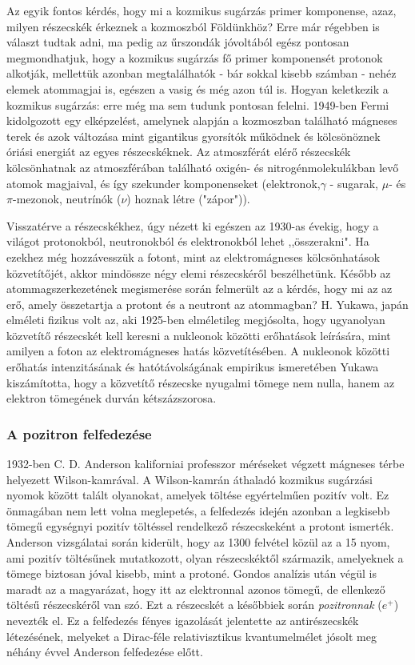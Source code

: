 \documentclass[../main.tex]{subfiles}
\begin{document}
Az egyik fontos kérdés, hogy mi a kozmikus sugárzás primer komponense, azaz, milyen részecskék érkeznek a kozmoszból Földünkhöz? Erre már régebben is választ tudtak adni, ma pedig az űrszondák jóvoltából egész
pontosan megmondhatjuk, hogy a kozmikus sugárzás fő primer komponensét protonok alkotják, mellettük azonban megtalálhatók - bár sokkal kisebb
számban - nehéz elemek atommagjai is, egészen a vasig és még azon túl is. Hogyan keletkezik a kozmikus sugárzás: erre még ma sem tudunk pontosan felelni. 1949-ben Fermi kidolgozott egy elképzelést, amelynek alapján
a kozmoszban található mágneses terek és azok változása mint gigantikus gyorsítók működnek és kölcsönöznek óriási energiát az egyes részecskéknek.
Az atmoszférát elérő részecskék kölcsönhatnak az atmoszférában található oxigén- és nitrogénmolekulákban levő atomok magjaival, és így szekunder komponenseket (elektronok,$\gamma$ - sugarak, $\mu$- és $\pi$-mezonok, neutrínók
($\nu$) hoznak létre ("zápor")).

Visszatérve a részecskékhez, úgy nézett ki egészen az 1930-as évekig, hogy a világot protonokból, neutronokból és elektronokból lehet ,,összerakni". Ha ezekhez még hozzávesszük a fotont, mint az elektromágneses
kölcsönhatások közvetítőjét, akkor mindössze négy elemi részecskéről beszélhetünk. Később az atommagszerkezetének megismerése során felmerült
az a kérdés, hogy mi az az erő, amely összetartja a protont és a neutront az atommagban? H. Yukawa, japán elméleti fizikus volt az, aki 1925-ben elméletileg megjósolta, hogy ugyanolyan közvetítő részecskét kell keresni a
nukleonok közötti erőhatások leírására, mint amilyen a foton az elektromágneses hatás közvetítésében. A nukleonok közötti erőhatás intenzitásának és
hatótávolságának empirikus ismeretében Yukawa kiszámította, hogy a közvetítő részecske nyugalmi tömege nem nulla, hanem az elektron tömegének durván kétszázszorosa.

\subsubsection*{A pozitron felfedezése}
1932-ben C. D. Anderson kaliforniai professzor méréseket végzett mágneses térbe helyezett Wilson-kamrával. A Wilson-kamrán áthaladó
kozmikus sugárzási nyomok között talált olyanokat, amelyek töltése egyértelműen pozitív volt. Ez önmagában nem lett volna meglepetés, a felfedezés
idején azonban a legkisebb tömegű egységnyi pozitív töltéssel rendelkező részecskeként a protont ismerték. Anderson vizsgálatai során kiderült, hogy
az 1300 felvétel közül az a 15 nyom, ami pozitív töltésűnek mutatkozott, olyan részecskéktől származik, amelyeknek a tömege biztosan jóval kisebb,
mint a protoné. Gondos analízis után végül is maradt az a magyarázat, hogy itt az elektronnal azonos tömegű, de ellenkező töltésű részecskéről van szó.
Ezt a részecskét a későbbiek során \textit{pozitronnak} ($e^+$) nevezték el. Ez a felfedezés fényes igazolását jelentette az antirészecskék létezésének, melyeket a
Dirac-féle relativisztikus kvantumelmélet jósolt meg néhány évvel Anderson felfedezése előtt.
\end{document}
